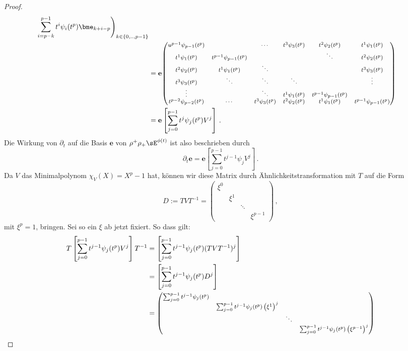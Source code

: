 \begin{proof}
\begin{align*}
    \sum_{i=p-k}^{p-1}t^i\psi_i(t^p)\bme_{k+i-p}\Bigg)_{k\in\{0,..,p-1\}}\\
  &= \mathbf{e}
{ %
  \footnotesize
  \begin{pmatrix}u^{p-1}\psi_{p-1}(t^p) && \cdots & t^{3}\psi_{3}(t^p) & t^{2}
  \psi_{2}(t^p) & t^{1}\psi_{1}(t^p)\\
  t^{1}\psi_{1}(t^p) & t^{p-1}\psi_{p-1}(t^p) &  &
  & \ddots & t^{2}\psi_{2}(t^p)\\
  t^{2}\psi_{2}(t^p) & t^{1}\psi_{1}(t^p) & \ddots &  &  & t^{3}\psi_{3}(t^p)\\
  t^{3}\psi_{3}(t^p) & \ddots & \ddots & \ddots &  & \vdots\\
  \vdots &  & \ddots & t^{1}\psi_{1}(t^p) & t^{p-1}\psi_{p-1}(t^p)\\
  t^{p-2}\psi_{p-2}(t^p) & \cdots & t^{3}\psi_{3}(t^p) & t^{2}\psi_{2}(t^p) &
  t^{1}\psi_{1}(t^p) & t^{p-1}\psi_{p-1}(t^p)
  \end{pmatrix}
} \\
  &= \mathbf{e}\left[\sum_{j=0}^{p-1}t^j\psi_j(t^p)V^j\right] \,.
\end{align*}
Die Wirkung von $\partial_t$ auf die Basis $\mathbf{e}$ von
$\rho^+\rho_+\sE^{\phi(t)}$ ist also beschrieben durch
\[
\partial_t\mathbf{e}=\mathbf{e}\left[\sum_{j=0}^{p-1}t^{j-1}\psi_jV^j\right]\,.
\]
Da $V$ das Minimalpolynom $\chi_V(X)=X^p-1$ hat, können wir diese Matrix durch
Ähnlichkeitstransformation mit $T$ auf die Form
\[
D:=TVT^{-1}=\begin{pmatrix}\xi^{0}\\
 & \xi^{1}\\
 &  & \ddots\\
 &  &  & \xi^{p-1}
\end{pmatrix} \,,
\]
mit $\xi^p=1$, bringen. Sei so ein $\xi$ ab jetzt fixiert. %
So dass gilt:
\begin{align*}
  T\left[\sum_{j=0}^{p-1}t^{j-1}\psi_j(t^p)V^j\right]T^{-1} 
  &= \left[\sum_{j=0}^{p-1}t^{j-1}\psi_j(t^p) (TVT^{-1})^j\right]\\
  &= \left[\sum_{j=0}^{p-1}t^{j-1}\psi_j(t^p)D^j\right]\\
  &=
{
  \footnotesize
  \begin{pmatrix}\sum_{j=0}^{p-1}t^{j-1}\psi_{j}(t^p)\\
    & \sum_{j=0}^{p-1}t^{j-1}\psi_{j}(t^p)\left(\xi^{1}\right)^{j}\\
    & & \ddots\\
    &  &  & \sum_{j=0}^{p-1}t^{j-1}\psi_{j}(t^p)\left(\xi^{p-1}\right)^{j}

\end{pmatrix}}
\end{align*}
\end{proof}
